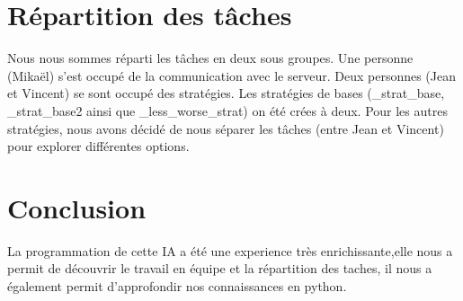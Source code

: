 \documentclass{rapport}
\begin{document}
	\chapter{Répartition des tâches}
		Nous nous sommes réparti les tâches en deux sous groupes. Une personne (Mikaël) s'est occupé de la communication
		avec le serveur. Deux personnes (Jean et Vincent) se sont occupé des stratégies. Les stratégies de bases (\_strat\_base, \_strat\_base2 ainsi que \_less\_worse\_strat) on été crées à deux. Pour les autres stratégies, nous avons décidé de nous séparer les tâches (entre Jean et Vincent) pour explorer différentes options.
	\chapter*{Conclusion}
La programmation de cette IA a été une experience très enrichissante,elle nous a permit de découvrir le travail en équipe et la répartition des taches, 
il nous a également permit d'approfondir nos connaissances en python.
	\printindex
\end{document}
